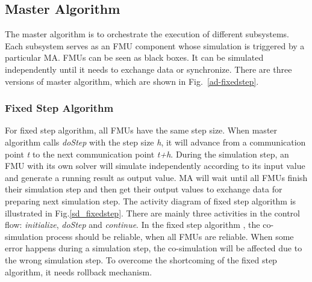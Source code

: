 \subsection{Master Algorithm}
The master algorithm is to orchestrate the execution of different subsystems. Each subsystem serves as an FMU component whose simulation is triggered by a particular MA. FMUs can be seen as black boxes. It can be simulated independently until it needs to exchange data or synchronize. There are three versions of master algorithm, which are shown in Fig.~\ref{ad-fixedstep}.
\begin{figure}[htbp]
\end{figure}
\subsubsection{Fixed Step Algorithm}
For fixed step algorithm, all FMUs have the same step size. When master algorithm calls \emph{doStep} with the step size \emph{h}, it will advance from a communication point \emph{t} to the next communication point \emph{t+h}. During the simulation step, an FMU with its own solver will simulate independently according to its input value and generate a running result as output value. MA will wait until all FMUs finish their simulation step and then get their output values to exchange data for preparing next simulation step. The activity diagram of fixed step algorithm is illustrated in Fig.\ref{sd_fixedstep}. There are mainly three activities in the control flow: \emph{initialize}, \emph{doStep} and \emph{continue}. In the fixed step algorithm \cite{BromanBGLMTW13}, the co-simulation process should be reliable, when all FMUs are reliable. When some error happens during a simulation step, the co-simulation will be affected due to the wrong simulation step. To overcome the shortcoming of the fixed step algorithm, it needs rollback mechanism.
